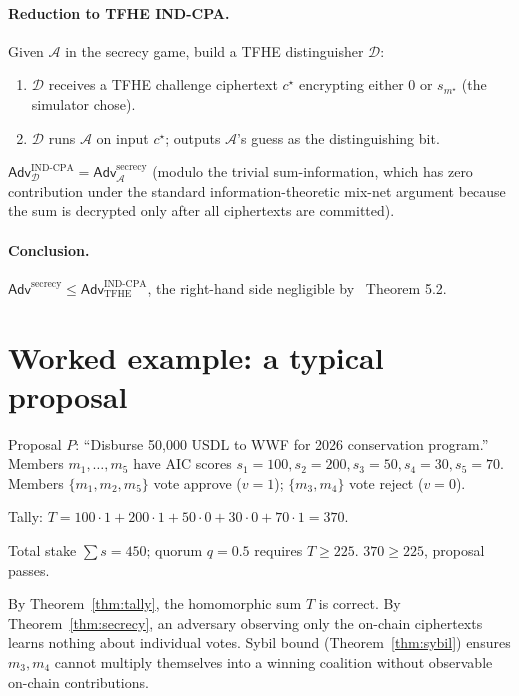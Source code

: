 \documentclass[11pt]{article}
\begin{document}
\paragraph{Reduction to TFHE IND-CPA.}
Given $\mathcal{A}$ in the secrecy game, build a TFHE distinguisher
$\mathcal{D}$:
\begin{enumerate}[nosep]
  \item $\mathcal{D}$ receives a TFHE challenge ciphertext $c^\star$
        encrypting either $0$ or $s_{m^\star}$ (the simulator
        chose).
  \item $\mathcal{D}$ runs $\mathcal{A}$ on input $c^\star$; outputs
        $\mathcal{A}$'s guess as the distinguishing bit.
\end{enumerate}
$\mathsf{Adv}_{\mathcal{D}}^{\mathrm{IND\text{-}CPA}} =
 \mathsf{Adv}_{\mathcal{A}}^{\mathrm{secrecy}}$ (modulo the trivial
sum-information, which has zero contribution under the standard
information-theoretic mix-net argument because the sum is
decrypted only after all ciphertexts are committed).

\paragraph{Conclusion.}
$\mathsf{Adv}^{\mathrm{secrecy}} \leq
 \mathsf{Adv}^{\mathrm{IND\text{-}CPA}}_{\mathrm{TFHE}}$, the
right-hand side negligible by~\cite{tfhe} Theorem 5.2.

\section{Worked example: a typical proposal}
\label{sec:example}

Proposal $P$: ``Disburse 50{,}000 USDL to WWF for 2026 conservation
program.'' Members $m_1, \ldots, m_5$ have AIC scores
$s_1 = 100, s_2 = 200, s_3 = 50, s_4 = 30, s_5 = 70$.
Members $\{m_1, m_2, m_5\}$ vote approve ($v=1$); $\{m_3, m_4\}$
vote reject ($v=0$).

Tally:
$T = 100 \cdot 1 + 200 \cdot 1 + 50 \cdot 0 + 30 \cdot 0 + 70 \cdot 1 = 370$.

Total stake $\sum s = 450$; quorum $q = 0.5$ requires $T \geq 225$.
$370 \geq 225$, proposal passes.

By Theorem~\ref{thm:tally}, the homomorphic sum $T$ is correct.
By Theorem~\ref{thm:secrecy}, an adversary observing only the
on-chain ciphertexts learns nothing about individual votes.
Sybil bound (Theorem~\ref{thm:sybil}) ensures $m_3, m_4$ cannot
multiply themselves into a winning coalition without
observable on-chain contributions.
\end{document}
